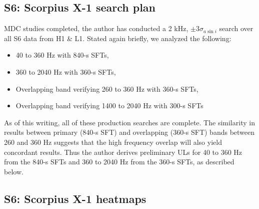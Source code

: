 



\subsection{S6: Scorpius X-1 search plan}

MDC studies completed, the author has conducted a 2 kHz, $\pm 3 \sigma_{a \sin i}$ search over all S6 data from H1 \& L1.
Stated again briefly, we analyzed the following:
\begin{itemize}
\item 40 to 360 Hz with 840-s SFTs,
\item 360 to 2040 Hz with 360-s SFTs,
\item Overlapping band verifying 260 to 360 Hz with 360-s SFTs,
\item Overlapping band verifying 1400 to 2040 Hz with 300-s SFTs
\end{itemize}
As of this writing, all of these production searches are complete.
The similarity in results between primary (840-s SFT) and overlapping (360-s SFT) bands between 260 and 360 Hz suggests that the high frequency overlap will also yield concordant results.
Thus the author derives preliminary ULs for 40 to 360 Hz from the 840-s SFTs and 360 to 2040 Hz from the 360-s SFTs, as described below.

\subsection{S6: Scorpius X-1 heatmaps}


